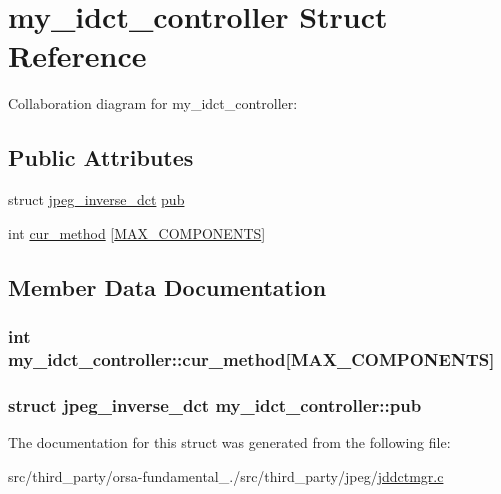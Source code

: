 \hypertarget{structmy__idct__controller}{}\section{my\+\_\+idct\+\_\+controller Struct Reference}
\label{structmy__idct__controller}


Collaboration diagram for my\+\_\+idct\+\_\+controller\+:
\subsection*{Public Attributes}
\begin{DoxyCompactItemize}
\item 
struct \hyperlink{structjpeg__inverse__dct}{jpeg\+\_\+inverse\+\_\+dct} \hyperlink{structmy__idct__controller_ace0aef71b868fc10da51a4be6f8b56ca}{pub}
\item 
int \hyperlink{structmy__idct__controller_ac13e3955a30c7b2a75c835dc803182cb}{cur\+\_\+method} \mbox{[}\hyperlink{jmorecfg_8h_a6d8c910a1fdb6d4762a05f7250e64322}{M\+A\+X\+\_\+\+C\+O\+M\+P\+O\+N\+E\+N\+T\+S}\mbox{]}
\end{DoxyCompactItemize}


\subsection{Member Data Documentation}
\hypertarget{structmy__idct__controller_ac13e3955a30c7b2a75c835dc803182cb}{}
\subsubsection[{cur\+\_\+method}]{\setlength{\rightskip}{0pt plus 5cm}int my\+\_\+idct\+\_\+controller\+::cur\+\_\+method\mbox{[}{\bf M\+A\+X\+\_\+\+C\+O\+M\+P\+O\+N\+E\+N\+T\+S}\mbox{]}}\label{structmy__idct__controller_ac13e3955a30c7b2a75c835dc803182cb}
\hypertarget{structmy__idct__controller_ace0aef71b868fc10da51a4be6f8b56ca}{}
\subsubsection[{pub}]{\setlength{\rightskip}{0pt plus 5cm}struct {\bf jpeg\+\_\+inverse\+\_\+dct} my\+\_\+idct\+\_\+controller\+::pub}\label{structmy__idct__controller_ace0aef71b868fc10da51a4be6f8b56ca}


The documentation for this struct was generated from the following file\+:\begin{DoxyCompactItemize}
\item 
src/third\+\_\+party/orsa-\/fundamental\+\_./src/third\+\_\+party/jpeg/\hyperlink{jddctmgr_8c}{jddctmgr.\+c}\end{DoxyCompactItemize}
